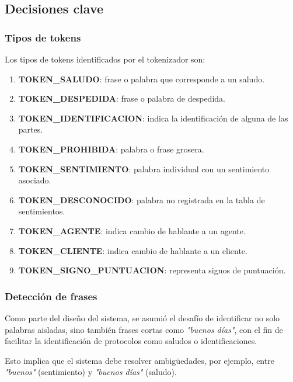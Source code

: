 \subsection{Decisiones clave}

\subsubsection{Tipos de tokens}
Los tipos de tokens identificados por el tokenizador son:

\begin{enumerate}
	\item {\footnotesize\textbf{TOKEN\_SALUDO}}: frase o palabra que corresponde a un saludo.
	\item {\footnotesize\textbf{TOKEN\_DESPEDIDA}}: frase o palabra de despedida.
	\item {\footnotesize\textbf{TOKEN\_IDENTIFICACION}}: indica la identificación de alguna de las partes.
	\item {\footnotesize\textbf{TOKEN\_PROHIBIDA}}: palabra o frase grosera.
	\item {\footnotesize\textbf{TOKEN\_SENTIMIENTO}}: palabra individual con un sentimiento asociado.
	\item {\footnotesize\textbf{TOKEN\_DESCONOCIDO}}: palabra no registrada en la tabla de sentimientos.
	\item {\footnotesize\textbf{TOKEN\_AGENTE}}: indica cambio de hablante a un agente.
	\item {\footnotesize\textbf{TOKEN\_CLIENTE}}: indica cambio de hablante a un cliente.
	\item {\footnotesize\textbf{TOKEN\_SIGNO\_PUNTUACION}}: representa signos de puntuación.
\end{enumerate}

\subsubsection{Detección de frases}
Como parte del diseño del sistema, se asumió el desafío de identificar no solo palabras
aisladas, sino también frases cortas como \textit{"buenos días"}, con el fin de facilitar la
identificación de protocolos como saludos o identificaciones.

Esto implica que el sistema debe resolver ambigüedades, por ejemplo, entre \textit{"buenos"}
(sentimiento) y \textit{"buenos días"} (saludo).

